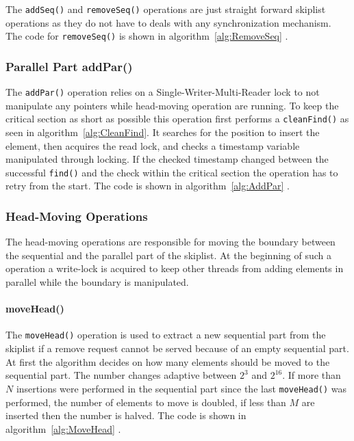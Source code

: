 The \texttt{addSeq()} and \texttt{removeSeq()} operations are just straight forward skiplist operations as they do not have to deals with any synchronization mechanism. The code for \texttt{removeSeq()} is shown in algorithm~\ref{alg:RemoveSeq} \cite{calciu_adaptive_2014}.

\subsubsection{Parallel Part addPar()}

The \texttt{addPar()} operation relies on a Single-Writer-Multi-Reader lock to not manipulate any pointers while head-moving operation are running. To keep the critical section as short as possible this operation first performs a \texttt{cleanFind()} as seen in algorithm~\ref{alg:CleanFind}. It searches for the position to insert the element, then acquires the read lock, and checks a timestamp variable manipulated through locking. If the checked timestamp changed between the successful \texttt{find()} and the check within the critical section the operation has to retry from the start. The code is shown in algorithm~\ref{alg:AddPar} \cite{calciu_adaptive_2014}.

\subsubsection{Head-Moving Operations}

The head-moving operations are responsible for moving the boundary between the sequential and the parallel part of the skiplist. At the beginning of such a operation a write-lock is acquired to keep other threads from adding elements in parallel while the boundary is manipulated.

\paragraph{moveHead()}

The \texttt{moveHead()} operation is used to extract a new sequential part from the skiplist if a remove request cannot be served because of an empty sequential part. At first the algorithm decides on how many elements should be moved to the sequential part. The number changes adaptive between $2^3$ and $2^{16}$. If more than $N$ insertions were performed in the sequential part since the last \texttt{moveHead()} was performed, the number of elements to move is doubled, if less than $M$ are inserted then the number is halved. The code is shown in algorithm~\ref{alg:MoveHead} \cite{calciu_adaptive_2014}.

